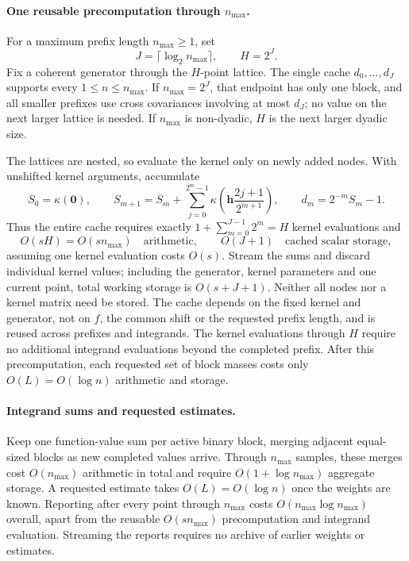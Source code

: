 \documentclass[11pt]{article}
\newcommand{\bh}{\boldsymbol{h}}
\begin{document}
\paragraph{One reusable precomputation through $n_{\max}$.}
For a maximum prefix length $n_{\max}\ge1$, set
\[
 J=\lceil\log_2 n_{\max}\rceil,\qquad H=2^J.
\]
Fix a coherent generator through the $H$-point lattice.
The single cache $d_0,\ldots,d_J$ supports every
$1\le n\le n_{\max}$. If $n_{\max}=2^J$, that endpoint has only
one block, and all smaller prefixes use cross covariances involving
at most $d_J$; no value on the next larger lattice is needed.
If $n_{\max}$ is non-dyadic, $H$ is the next larger dyadic size.

The lattices are nested, so evaluate the kernel only on newly added
nodes. With unshifted kernel arguments, accumulate
\[
 S_0=\kappa(\boldsymbol0),\qquad
 S_{m+1}=S_m+\sum_{j=0}^{2^m-1}
 \kappa\!\left(\bh\frac{2j+1}{2^{m+1}}\right),\qquad
 d_m=2^{-m}S_m-1.
\]
Thus the entire cache requires exactly
$1+\sum_{m=0}^{J-1}2^m=H$ kernel evaluations and
\[
 O(sH)=O(sn_{\max})\quad\text{arithmetic},\qquad
 O(J+1)\quad\text{cached scalar storage},
\]
assuming one kernel evaluation costs $O(s)$.
Stream the sums and discard individual kernel values; including the
generator, kernel parameters and one current point, total working
storage is $O(s+J+1)$. Neither all nodes nor a kernel matrix need be
stored. The cache depends on the fixed kernel and generator, not on
$f$, the common shift or the requested prefix length, and is reused
across prefixes and integrands. The kernel evaluations through $H$
require no additional integrand evaluations beyond the completed
prefix. After this precomputation, each requested set of block masses
costs only $O(L)=O(\log n)$ arithmetic and storage.

\paragraph{Integrand sums and requested estimates.}
Keep one function-value sum per active binary block, merging adjacent
equal-sized blocks as new completed values arrive.
Through $n_{\max}$ samples, these merges cost $O(n_{\max})$
arithmetic in total and require $O(1+\log n_{\max})$ aggregate storage.
A requested estimate takes $O(L)=O(\log n)$ once the weights are known.
Reporting after every point through $n_{\max}$ costs
$O(n_{\max}\log n_{\max})$ overall, apart from the reusable
$O(sn_{\max})$ precomputation and integrand evaluation.
Streaming the reports requires no archive of earlier weights or estimates.
\end{document}
